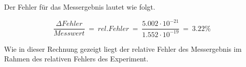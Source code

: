 \noindent Der Fehler für das Messergebnis lautet wie folgt.

$$
\frac{\Delta Fehler}{Messwert} \ = \ rel. Fehler \ = \ \frac{5.002 \cdot 10^{-21}}{1.552 \cdot 10^{-19}} \ = \ 3.22 \%
$$

\noindent Wie in dieser Rechnung gezeigt liegt der relative Fehler des Messergebnis im Rahmen des relativen Fehlers des Experiment. 





